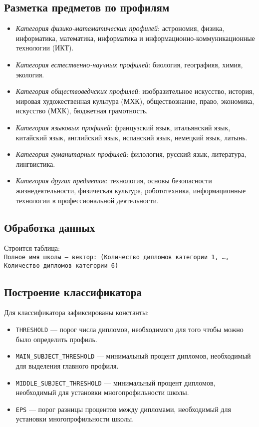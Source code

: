 \documentclass{article}
\begin{document}
\subsection{Разметка предметов по профилям}
\begin{itemize}
    \item \textit{Категория физико-математических профилей}: астрономия, физика, информатика, математика, информатика и информационно-коммуникационные технологии (ИКТ).
    \item \textit{Категория естественно-научных профилей}: биология, географияя, химия, экология.
    \item \textit{Категория обществоведчских профилей}: изобразительное искусство, история, мировая художественная культура (МХК), обществознание, право, экономика, искусство (МХК), бюджетная грамотность.
    \item \textit{Категория языковых профилей}: французский язык, итальянский язык, китайский язык, английский язык, испанский язык, немецкий язык, латынь.
    \item \textit{Категория гуманитарных профилей}: филология, русский язык, литература, лингвистика.
    \item \textit{Категория других предметов}: технология, основы безопасности жизнедеятельности, физическая культура, робототехника, информационные технологии в профессиональной деятельности.
\end{itemize}

\subsection{Обработка данных}
Строится таблица: \\
\small{\texttt{Полное имя школы --- вектор: (Количество дипломов категории 1, \dots, Количество дипломов категории 6)}}


\subsection{Построение классификатора}
Для классификатора зафиксированы константы:
\begin{itemize}
    \item \texttt{THRESHOLD} --- порог числа дипломов, необходимого для того чтобы можно было определить профиль. 
    \item \texttt{MAIN\_SUBJECT\_THRESHOLD} --- минимальный процент дипломов, необходимый для выделения главного профиля.
    \item \texttt{MIDDLE\_SUBJECT\_THRESHOLD} --- минимальный процент дипломов, необходимый для установки многопрофильности школы.
    \item \texttt{EPS} --- порог разницы процентов между дипломами, необходимый для установки многопрофильности школы.
\end{itemize}
\end{document}
